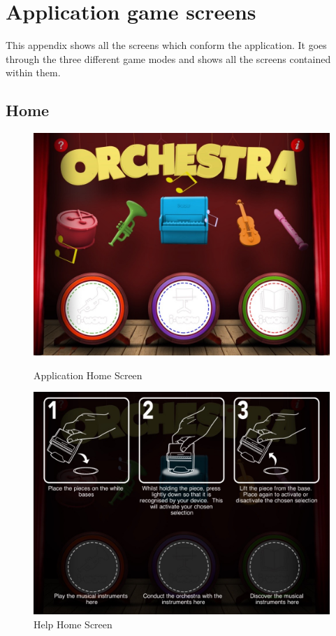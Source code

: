 \cleardoublepage
\chapter{Application game screens}

This appendix shows all the screens which conform the application. It goes through the three different game modes and shows all the screens contained within them.

\cleardoublepage

\section{Home}

\begin{figure}[ht!]
  \centering
  \includegraphics[width=350pt]{graphics/use-case/home_screen.jpg}
  \vspace{0.05cm}
  \caption{Application Home Screen}
  \vspace{0.6cm}

  \includegraphics[width=350pt]{graphics/use-case/help_home_screen.jpg}
  \vspace{0.05cm}
  \caption{Help Home Screen}
\end{figure}

